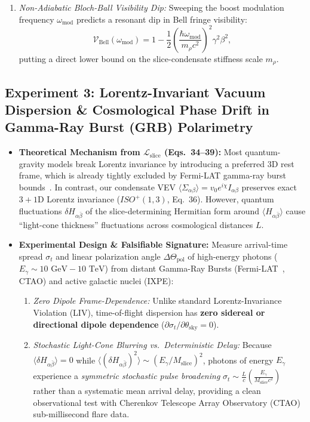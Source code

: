 \documentclass[11pt,a4paper]{article}
\begin{document}
\begin{itemize}
\begin{enumerate}
        \item \emph{Non-Adiabatic Bloch-Ball Visibility Dip:} Sweeping the boost modulation frequency $\omega_{\text{mod}}$ predicts a resonant dip in Bell fringe visibility:
        \begin{equation}
        \mathcal{V}_{\text{Bell}}(\omega_{\text{mod}}) = 1 - \frac{1}{2}\left( \frac{\hbar \omega_{\text{mod}}}{m_\rho c^2} \right)^2 \gamma^2 \beta^2,
        \end{equation}
        putting a direct lower bound on the slice-condensate stiffness scale $m_\rho$.
    \end{enumerate}
\end{itemize}

\subsection{Experiment 3: Lorentz-Invariant Vacuum Dispersion \& Cosmological Phase Drift in Gamma-Ray Burst (GRB) Polarimetry}
\begin{itemize}
    \item \textbf{Theoretical Mechanism from $\mathcal{L}_{\text{slice}}$ (Eqs.\ 34--39):}
    Most quantum-gravity models break Lorentz invariance by introducing a preferred 3D rest frame, which is already tightly excluded by Fermi-LAT gamma-ray burst bounds~\cite{Vasileiou2013}. In contrast, our condensate VEV $\langle \Sigma_{\alpha\beta} \rangle = v_0 e^{i\chi} I_{\alpha\beta}$ preserves exact $3+1\text{D}$ Lorentz invariance ($ISO^+(1,3)$, Eq.\ 36). However, quantum fluctuations $\delta H_{\alpha\bar{\beta}}$ of the slice-determining Hermitian form around $\langle H_{\alpha\bar{\beta}} \rangle$ cause ``light-cone thickness'' fluctuations across cosmological distances $L$.
    \item \textbf{Experimental Design \& Falsifiable Signature:}
    Measure arrival-time spread $\sigma_t$ and linear polarization angle $\Delta\Theta_{\text{pol}}$ of high-energy photons ($E_\gamma \sim 10\text{ GeV} - 10\text{ TeV}$) from distant Gamma-Ray Bursts (Fermi-LAT~\cite{Vasileiou2013}, CTAO) and active galactic nuclei (IXPE):
    \begin{enumerate}
        \item \emph{Zero Dipole Frame-Dependence:} Unlike standard Lorentz-Invariance Violation (LIV), time-of-flight dispersion has \textbf{zero sidereal or directional dipole dependence} ($\partial \sigma_t / \partial \theta_{\text{sky}} = 0$).
        \item \emph{Stochastic Light-Cone Blurring vs.\ Deterministic Delay:} Because $\langle \delta H_{\alpha\bar{\beta}} \rangle = 0$ while $\langle (\delta H_{\alpha\bar{\beta}})^2 \rangle \sim (E_\gamma / M_{\text{slice}})^2$, photons of energy $E_\gamma$ experience a \emph{symmetric stochastic pulse broadening} $\sigma_t \sim \frac{L}{c}\left(\frac{E_\gamma}{M_{\text{slice}}c^2}\right)$ rather than a systematic mean arrival delay, providing a clean observational test with Cherenkov Telescope Array Observatory (CTAO) sub-millisecond flare data.
    \end{enumerate}
\end{itemize}
\end{document}
